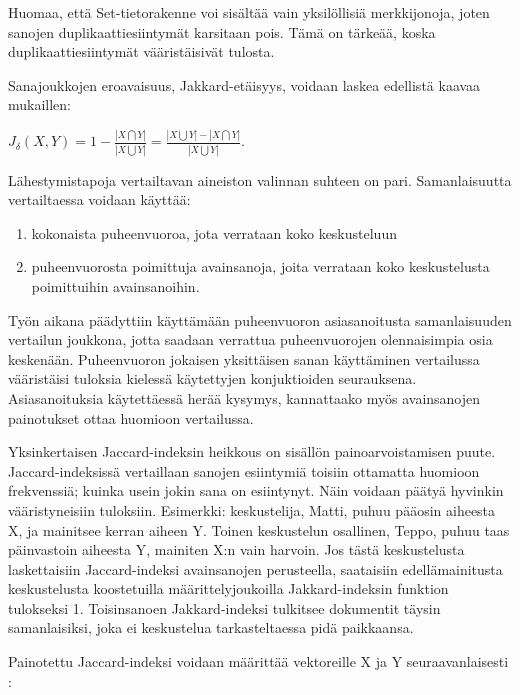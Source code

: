 \documentclass[11pt,a4paper,oneside]{memoir}
\begin{document}
Huomaa, että Set-tietorakenne voi sisältää vain yksilöllisiä merkkijonoja, joten sanojen duplikaattiesiintymät karsitaan pois. Tämä on tärkeää, koska duplikaattiesiintymät vääristäisivät tulosta.

Sanajoukkojen eroavaisuus, Jakkard-etäisyys, voidaan laskea edellistä kaavaa mukaillen:

\begin{math}
J_\delta(X, Y) = 1 - \frac{| X \bigcap Y |}{| X \bigcup Y |} = \frac{| X \bigcup Y | - | X \bigcap Y |}{| X \bigcup Y |}.
\end{math}

Lähestymistapoja vertailtavan aineiston valinnan suhteen on pari. Samanlaisuutta vertailtaessa voidaan käyttää:

\begin{enumerate}
\item kokonaista puheenvuoroa, jota verrataan koko keskusteluun
\item puheenvuorosta poimittuja avainsanoja, joita verrataan koko keskustelusta poimittuihin avainsanoihin.
\end{enumerate}

Työn aikana päädyttiin käyttämään puheenvuoron asiasanoitusta samanlaisuuden vertailun joukkona, jotta saadaan verrattua puheenvuorojen olennaisimpia osia keskenään. Puheenvuoron jokaisen yksittäisen sanan käyttäminen vertailussa vääristäisi tuloksia kielessä käytettyjen konjuktioiden seurauksena. Asiasanoituksia käytettäessä herää kysymys, kannattaako myös avainsanojen painotukset ottaa huomioon vertailussa.

Yksinkertaisen Jaccard-indeksin heikkous on sisällön painoarvoistamisen puute. Jaccard-indeksissä vertaillaan sanojen esiintymiä toisiin ottamatta huomioon frekvenssiä; kuinka usein jokin sana on esiintynyt. Näin voidaan päätyä hyvinkin vääristyneisiin tuloksiin. Esimerkki: keskustelija, Matti, puhuu pääosin aiheesta X, ja mainitsee kerran aiheen Y. Toinen keskustelun osallinen, Teppo, puhuu taas päinvastoin aiheesta Y, mainiten X:n vain harvoin. Jos tästä keskustelusta laskettaisiin Jaccard-indeksi avainsanojen perusteella, saataisiin edellämainitusta keskustelusta koostetuilla määrittelyjoukoilla Jakkard-indeksin funktion tulokseksi 1. Toisinsanoen Jakkard-indeksi tulkitsee dokumentit täysin samanlaisiksi, joka ei keskustelua tarkasteltaessa pidä paikkaansa.

Painotettu Jaccard-indeksi voidaan määrittää vektoreille X ja Y seuraavanlaisesti \cite[s. 2]{finding-the-jaccard-median}:
\end{document}
